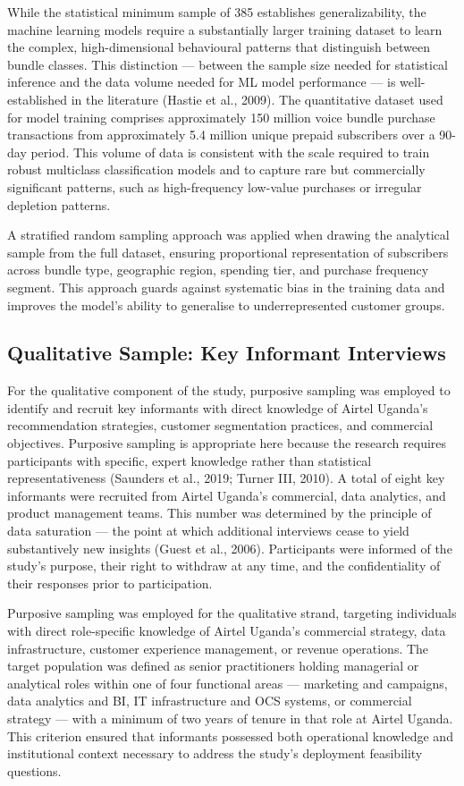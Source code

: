 While the statistical minimum sample of 385 establishes generalizability, the machine learning models require a substantially larger training dataset to learn the complex, high-dimensional behavioural patterns that distinguish between bundle classes. This distinction --- between the sample size needed for statistical inference and the data volume needed for ML model performance --- is well-established in the literature (Hastie et al., 2009). The quantitative dataset used for model training comprises approximately 150 million voice bundle purchase transactions from approximately 5.4 million unique prepaid subscribers over a 90-day period. This volume of data is consistent with the scale required to train robust multiclass classification models and to capture rare but commercially significant patterns, such as high-frequency low-value purchases or irregular depletion patterns.

A stratified random sampling approach was applied when drawing the analytical sample from the full dataset, ensuring proportional representation of subscribers across bundle type, geographic region, spending tier, and purchase frequency segment. This approach guards against systematic bias in the training data and improves the model's ability to generalise to underrepresented customer groups.


\subsection{Qualitative Sample: Key Informant Interviews}

For the qualitative component of the study, purposive sampling was employed to identify and recruit key informants with direct knowledge of Airtel Uganda's recommendation strategies, customer segmentation practices, and commercial objectives. Purposive sampling is appropriate here because the research requires participants with specific, expert knowledge rather than statistical representativeness (Saunders et al., 2019; Turner III, 2010). A total of eight key informants were recruited from Airtel Uganda's commercial, data analytics, and product management teams. This number was determined by the principle of data saturation --- the point at which additional interviews cease to yield substantively new insights (Guest et al., 2006). Participants were informed of the study's purpose, their right to withdraw at any time, and the confidentiality of their responses prior to participation.

Purposive sampling was employed for the qualitative strand, targeting individuals
with direct role-specific knowledge of Airtel Uganda's commercial strategy, data
infrastructure, customer experience management, or revenue operations. The target
population was defined as senior practitioners holding managerial or analytical
roles within one of four functional areas --- marketing and campaigns, data
analytics and BI, IT infrastructure and OCS systems, or commercial strategy ---
with a minimum of two years of tenure in that role at Airtel Uganda. This criterion
ensured that informants possessed both operational knowledge and institutional
context necessary to address the study's deployment feasibility questions.

